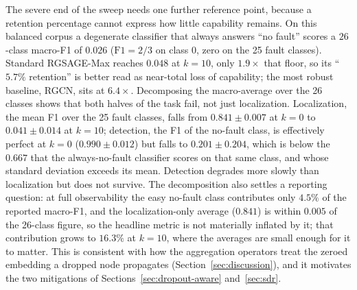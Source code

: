 \documentclass[3p,times,procedia]{elsarticle}
\begin{document}
The severe end of the sweep needs one further reference point, because a retention percentage cannot express how little capability remains. On this balanced corpus a degenerate classifier that always answers ``no fault'' scores a $26$-class macro-F1 of $0.026$ ($\mathrm{F1}=2/3$ on class 0, zero on the 25 fault classes). Standard RGSAGE-Max reaches $0.048$ at $k=10$, only $1.9\times$ that floor, so its ``$5.7\%$ retention'' is better read as near-total loss of capability; the most robust baseline, RGCN, sits at $6.4\times$. Decomposing the macro-average over the 26 classes shows that both halves of the task fail, not just localization. Localization, the mean F1 over the 25 fault classes, falls from $0.841\pm0.007$ at $k=0$ to $0.041\pm0.014$ at $k=10$; detection, the F1 of the no-fault class, is effectively perfect at $k=0$ ($0.990\pm0.012$) but falls to $0.201\pm0.204$, which is below the $0.667$ that the always-no-fault classifier scores on that same class, and whose standard deviation exceeds its mean. Detection degrades more slowly than localization but does not survive. The decomposition also settles a reporting question: at full observability the easy no-fault class contributes only $4.5\%$ of the reported macro-F1, and the localization-only average ($0.841$) is within $0.005$ of the 26-class figure, so the headline metric is not materially inflated by it; that contribution grows to $16.3\%$ at $k=10$, where the averages are small enough for it to matter. This is consistent with how the aggregation operators treat the zeroed embedding a dropped node propagates (Section~\ref{sec:discussion}), and it motivates the two mitigations of Sections~\ref{sec:dropout-aware} and~\ref{sec:sdr}.
\end{document}
